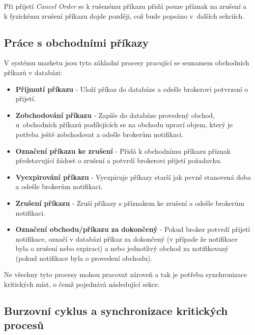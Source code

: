 \documentclass[thesis=M,czech]{FITthesis}[2012/06/26]
\begin{document}
	Při přijetí \textit{Cancel Order} se k rušenému příkazu přidá pouze příznak na zrušení a k fyzickému zrušení příkazu dojde později, což bude popsáno v~dalších sekciích.

\subsection{Práce s obchodními příkazy}
\label{sec:crit_processes}
	V systému marketu jsou tyto základní procesy pracující se seznamem obchodních příkazů v databázi:
	
\begin{itemize}

\item \textbf{Přijmutí příkazu} - Uloží příkaz do databáze a odešle brokerovi potvrzení o přijetí.

\item \textbf{Zobchodování příkazu} - Zapíše do databáze provedený obchod, u~obchodních příkazů podílejících se na obchodu upraví objem, který je potřeba ještě zobchodovat a odešle brokerům notifikaci.

\item \textbf{Označení příkazu ke zrušení} - Přidá k obchodnímu příkazu příznak představující žádost o zrušení a potvrdí brokerovi přijetí požadavku.

\item \textbf{Vyexpirování příkazu} - Vyexpiruje příkazy starší jak pevně stanovená doba a odešle brokerům notifikaci.

\item \textbf{Zrušení příkazu} - Zruší příkazy s příznakem ke zrušení a odešle brokerům notifikaci.

\item \textbf{Označení obchodu/příkazu za dokončený} - Pokud broker potvrdí přijetí notifikace, označí v databázi příkaz za dokončený (v případe že notifikace byla o zrušení nebo expiraci) a nebo jednotlivý obchod za notifikovaný (pokud notifikace byla o provedení obchodu).

\end{itemize}	
	
	Ne všechny tyto procesy mohou pracovat zároveň a tak je potřeba synchronizace kritických míst, o čemž pojednává následující sekce.

\subsection{Burzovní cyklus a synchronizace kritických procesů}
\label{sec:cycle}
	
\end{document}
